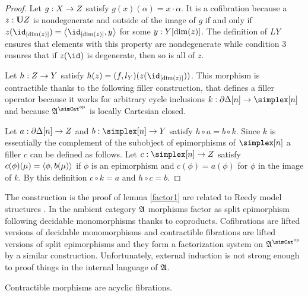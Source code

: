 \documentclass[csh.tex]{subfiles}
\begin{document}
\begin{proof}
Let $g: X\to Z$ satisfy $g(x)(\alpha) = x\cdot\alpha$. It is a cofibration because a $z:\mathbf{U} Z$ is nondegenerate and outside of the image of $g$ if and only if $z(\id_{[\dim(z)]}) = \tuplet{\id_{[\dim(z)]},y}$ for some $y: Y[\dim(z)]$. The definition of $LY$ ensures that elements with this property are nondegenerate while condition 3 ensures that if $z(\id)$ is degenerate, then so is all of $z$.

Let $h: Z\to Y$ satisfy $h(z) = (f,l_Y)(z(\id_{[\dim(z)]}))$. This morphism is contractible thanks to the following filler construction, that defines a filler operator because it works for arbitrary cycle inclusions $k\of\cycle[n]\to\simplex[n]$ and because $\ambient \s$ is locally Cartesian closed.

Let $a: \partial\Delta[n]\to Z$ and $b\of \simplex[n]\to Y$ satisfy $h\circ a = b\circ k$.
Since $k$ is essentially the complement of the subobject of epimorphisms of $\simplex[n]$ a filler $c$ can be defined as follows.
Let $c\of \simplex[n]\to Z$ satisfy $c(\phi)(\mu) = \left\langle \phi,b(\mu) \right\rangle$ if $\phi$ is an epimorphism and $c(\phi) = a(\phi)$ for $\phi$ in the image of $k$. By this definition $c\circ k = a$ and $h\circ c = b$.

\end{proof}

\begin{remark} The construction is the proof of lemma \ref{factor1} are related to Reedy model structures \citep{Reedy}. In the ambient category $\mathfrak A$ morphisms factor as split epimorphism following decidable monomorphisms thanks to coproducts. Cofibrations are lifted versions of decidable monomorphisms and contractible fibrations are lifted versions of split epimorphisms and they form a factorization system on $\ambient\s$ by a similar construction. Unfortunately, external induction is not strong enough to proof things in the internal language of $\mathfrak A$.
\end{remark}

\begin{lemma} Contractible morphisms are acyclic fibrations.\label{Reedy}\end{lemma}
\end{document}
